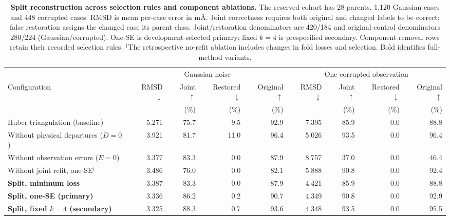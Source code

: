 \begin{table}[t]
\centering
\caption{\textbf{Split reconstruction across selection rules and component ablations.} The reserved cohort has 28 parents, 1,120 Gaussian cases and 448 corrupted cases. RMSD is mean per-case error in m\AA. Joint correctness requires both original and changed labels to be correct; false restoration assigns the changed case its parent class. Joint/restoration denominators are 420/184 and original-control denominators 280/224 (Gaussian/corrupted). One-SE is development-selected primary; fixed $k=4$ is prespecified secondary. Component-removal rows retain their recorded selection rules. $^\dagger$The retrospective no-refit ablation includes changes in fold losses and selection. Bold identifies full-method variants.}
\label{tab:reconstruction}
\small\setlength{\tabcolsep}{2pt}\renewcommand{\arraystretch}{1.10}
\begin{tabular*}{\textwidth}{@{\extracolsep{\fill}}lrrrrrrrr@{}}
\toprule
&\multicolumn{4}{c}{Gaussian noise}&\multicolumn{4}{c}{One corrupted observation}\\
\cmidrule(lr){2-5}\cmidrule(l){6-9}
Configuration & RMSD $\downarrow$ & Joint $\uparrow$ & Restored $\downarrow$ & Original $\uparrow$ & RMSD $\downarrow$ & Joint $\uparrow$ & Restored $\downarrow$ & Original $\uparrow$\\
& & (\%) & (\%) & (\%) & & (\%) & (\%) & (\%)\\
\midrule
Huber triangulation (baseline) & 5.271 & 75.7 & 9.5 & 92.9 & 7.395 & 85.9 & 0.0 & 88.8\\
\addlinespace[3pt]
Without physical departures ($D=0$) & 3.921 & 81.7 & 11.0 & 96.4 & 5.026 & 93.5 & 0.0 & 96.4\\
Without observation errors ($E=0$) & 3.377 & 83.3 & 0.0 & 87.9 & 8.757 & 37.0 & 0.0 & 46.4\\
Without joint refit, one-SE$^\dagger$ & 3.486 & 76.0 & 0.0 & 82.1 & 5.888 & 90.8 & 0.0 & 92.4\\
\addlinespace[3pt]
\textbf{Split, minimum loss} & 3.387 & 83.3 & 0.0 & 87.9 & 4.421 & 85.9 & 0.0 & 88.8\\
\textbf{Split, one-SE (primary)} & 3.336 & 86.2 & 0.2 & 90.7 & 4.349 & 90.8 & 0.0 & 92.9\\
\textbf{Split, fixed $k=4$ (secondary)} & 3.325 & 88.3 & 0.7 & 93.6 & 4.348 & 93.5 & 0.0 & 95.5\\
\bottomrule
\end{tabular*}
\end{table}
